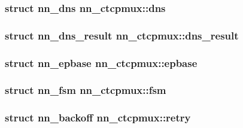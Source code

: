 \subsubsection[{dns}]{\setlength{\rightskip}{0pt plus 5cm}struct {\bf nn\+\_\+dns} nn\+\_\+ctcpmux\+::dns}\hypertarget{structnn__ctcpmux_af6ee113d28282fd32301914547a26aae}{}\label{structnn__ctcpmux_af6ee113d28282fd32301914547a26aae}
\subsubsection[{dns\+\_\+result}]{\setlength{\rightskip}{0pt plus 5cm}struct {\bf nn\+\_\+dns\+\_\+result} nn\+\_\+ctcpmux\+::dns\+\_\+result}\hypertarget{structnn__ctcpmux_a1f0c2bf52607b4504f10598bf1cbcf62}{}\label{structnn__ctcpmux_a1f0c2bf52607b4504f10598bf1cbcf62}
\subsubsection[{epbase}]{\setlength{\rightskip}{0pt plus 5cm}struct {\bf nn\+\_\+epbase} nn\+\_\+ctcpmux\+::epbase}\hypertarget{structnn__ctcpmux_a5979503ad3f681f42da267bcceda7545}{}\label{structnn__ctcpmux_a5979503ad3f681f42da267bcceda7545}
\subsubsection[{fsm}]{\setlength{\rightskip}{0pt plus 5cm}struct {\bf nn\+\_\+fsm} nn\+\_\+ctcpmux\+::fsm}\hypertarget{structnn__ctcpmux_a5e3c1c136cd2b28b585b7311dc61c795}{}\label{structnn__ctcpmux_a5e3c1c136cd2b28b585b7311dc61c795}
\subsubsection[{retry}]{\setlength{\rightskip}{0pt plus 5cm}struct {\bf nn\+\_\+backoff} nn\+\_\+ctcpmux\+::retry}\hypertarget{structnn__ctcpmux_a8c52683d34482048bedc8b3a60c9f901}{}\label{structnn__ctcpmux_a8c52683d34482048bedc8b3a60c9f901}
